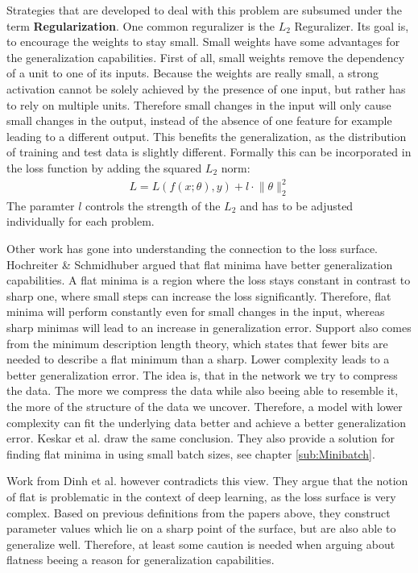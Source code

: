 Strategies that are developed to deal with this problem are subsumed under the
term \textbf{Regularization}. One common reguralizer is the $L_2$ Reguralizer.
Its goal is, to encourage the weights to stay small. Small weights have some
advantages for the generalization capabilities. First of all, small weights
remove the dependency of a unit to one of its inputs. Because the weights are
really small, a strong activation cannot be solely achieved by the presence of
one input, but rather has to rely on multiple units. Therefore small changes in
the input will only cause small changes in the output, instead of the absence of
one feature for example leading to a different output. This benefits the
generalization, as the distribution of training and test data is slightly
different. Formally this can be incorporated in the loss function by adding the
squared $L_2$ norm:
\begin{align}
    L= L(f(x;\theta), y)+l \cdot \lVert \theta \rVert_2^2
\end{align}
The paramter $l$ controls the strength of the $L_2$ and has to be adjusted individually
for each problem.

Other work has gone into understanding the connection to the loss surface.
Hochreiter \& Schmidhuber \cite{hochreiter1997flat} argued that flat minima
have better generalization capabilities. A flat minima is a region where the
loss stays constant in contrast to sharp one, where small steps can increase
the loss significantly. Therefore, flat minima will perform constantly even for
small changes in the input, whereas sharp minimas will lead to an increase in
generalization error. Support also comes from the minimum description length
theory, which states that fewer bits are needed to describe a flat minimum than
a sharp. Lower complexity leads to a better generalization error. The idea is,
that in the network we try to compress the data. The more we compress the data
while also beeing able to resemble it, the more of the structure of the data we
uncover. Therefore, a model with lower complexity can fit the underlying data
better and achieve a better generalization error. Keskar et al.
\cite{keskar2016large} draw the same conclusion. They also provide a solution
for finding flat minima in using small batch sizes, see chapter
\ref{sub:Minibatch}.

Work from Dinh et al. \cite{dinh2017sharp} however contradicts this view. They
argue that the notion of flat is problematic in the context of deep learning, as
the loss surface is very complex. Based on previous definitions from the
papers above, they construct parameter values which lie on a sharp point of the
surface, but are also able to generalize well. Therefore, at least some caution
is needed when arguing about flatness beeing a reason for generalization
capabilities.

